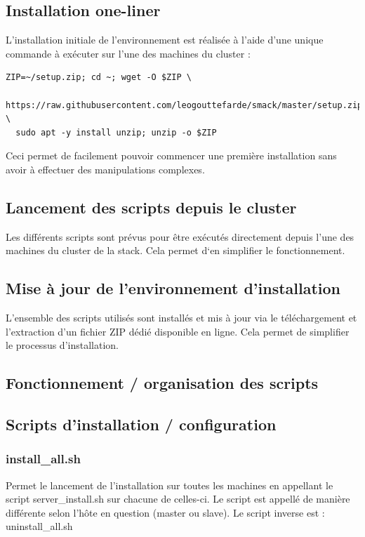 \documentclass[a4paper, 11pt, titlepage]{article}
\begin{document}
\subsection {Installation one-liner}

L'installation initiale de l'environnement est réalisée à l'aide d'une unique commande à exécuter sur l'une des machines du cluster :

\begin{verbatim}
ZIP=~/setup.zip; cd ~; wget -O $ZIP \
  https://raw.githubusercontent.com/leogouttefarde/smack/master/setup.zip; \
  sudo apt -y install unzip; unzip -o $ZIP
\end{verbatim}

Ceci permet de facilement pouvoir commencer une première installation sans avoir à effectuer des manipulations complexes.


\subsection {Lancement des scripts depuis le cluster}

Les différents scripts sont prévus pour être exécutés directement depuis l'une des machines du cluster de la stack. Cela permet d‘en simplifier le fonctionnement.


\subsection {Mise à jour de l'environnement d'installation}

L'ensemble des scripts utilisés sont installés et mis à jour via le téléchargement et l'extraction d'un fichier ZIP dédié disponible en ligne. Cela permet de simplifier le processus d'installation.


\subsection {Fonctionnement / organisation des scripts}

\subsection{Scripts d'installation / configuration}

\subsubsection*{install\_all.sh}
Permet le lancement de l'installation sur toutes les machines en appellant le script server\_install.sh sur chacune de celles-ci. Le script est appellé de manière différente selon l'hôte en question (master ou slave). Le script inverse est : uninstall\_all.sh
\end{document}
